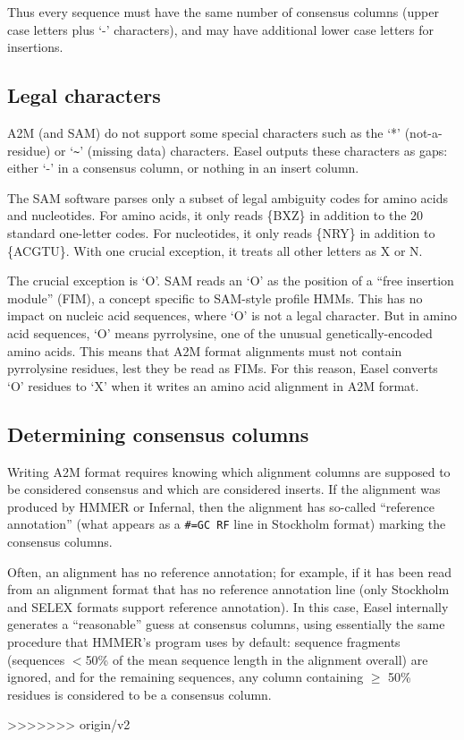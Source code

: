 Thus every sequence must have the same number of consensus columns
(upper case letters plus `-' characters), and may have additional lower
case letters for insertions.

\subsection{Legal characters}

A2M (and SAM) do not support some special characters such as the `*'
(not-a-residue) or `\verb+~+' (missing data) characters. Easel outputs these
characters as gaps: either `-' in a consensus column, or nothing in an
insert column.

The SAM software parses only a subset of legal ambiguity codes for
amino acids and nucleotides. For amino acids, it only reads \{BXZ\} in
addition to the 20 standard one-letter codes. For nucleotides, it only
reads \{NRY\} in addition to \{ACGTU\}. With one crucial exception, it
treats all other letters as X or N. 

The crucial exception is `O'. SAM reads an `O' as the position of a
``free insertion module'' (FIM), a concept specific to SAM-style
profile HMMs. This has no impact on nucleic acid sequences, where `O'
is not a legal character. But in amino acid sequences, `O' means
pyrrolysine, one of the unusual genetically-encoded amino acids.  This
means that A2M format alignments must not contain pyrrolysine
residues, lest they be read as FIMs. For this reason, Easel converts
`O' residues to `X' when it writes an amino acid alignment in A2M
format.

\subsection{Determining consensus columns}

Writing A2M format requires knowing which alignment columns are
supposed to be considered consensus and which are considered
inserts. If the alignment was produced by HMMER or Infernal, then the
alignment has so-called ``reference annotation'' (what appears as a
\verb+#=GC RF+ line in Stockholm format) marking the consensus
columns. 

Often, an alignment has no reference annotation; for example, if it
has been read from an alignment format that has no reference
annotation line (only Stockholm and SELEX formats support reference
annotation). In this case, Easel internally generates a ``reasonable''
guess at consensus columns, using essentially the same procedure that
HMMER's  program uses by default: sequence fragments
(sequences $<$50\% of the mean sequence length in the alignment
overall) are ignored, and for the remaining sequences, any column
containing $\geq$ 50\% residues is considered to be a consensus
column.










>>>>>>> origin/v2
